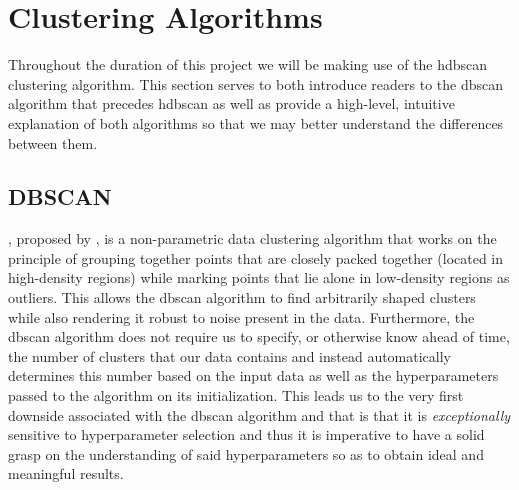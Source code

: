 \clearpage

\section{Clustering Algorithms}
\label{sec:Background-Information:Clustering-Algorithms}
Throughout the duration of this project we will be making use of the \gls{hdbscan} clustering algorithm. This section serves to both introduce readers to the \gls{dbscan} algorithm that precedes \gls{hdbscan} as well as provide a high-level, intuitive explanation of both algorithms so that we may better understand the differences between them.

\subsection{DBSCAN}
\label{subsec:Background-Information:DBSCAN}
, proposed by \citet{Ester}, is a non-parametric data clustering algorithm that works on the principle of grouping together points that are closely packed together (\ie located in high-density regions) while marking points that lie alone in low-density regions as outliers. This allows the \gls{dbscan} algorithm to find arbitrarily shaped clusters while also rendering it robust to noise present in the data. Furthermore, the \gls{dbscan} algorithm does not require us to specify, or otherwise know ahead of time, the number of clusters that our data contains and instead automatically determines this number based on the input data as well as the hyperparameters passed to the algorithm on its initialization. This leads us to the very first downside associated with the \gls{dbscan} algorithm and that is that it is \textit{exceptionally} sensitive to hyperparameter selection and thus it is imperative to have a solid grasp on the understanding of said hyperparameters so as to obtain ideal and meaningful results.

